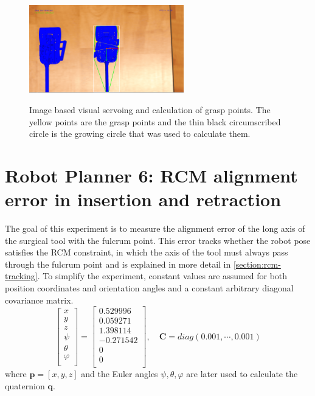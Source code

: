 \begin{center}
\begin{figure}[!htb]
\centering
\includegraphics[width=0.6\textwidth]{images/grasp-points-triangle.png}\\
\caption{Image based visual servoing and calculation of grasp points. The yellow points are the grasp points and the thin black circumscribed circle is the growing circle that was used to calculate them.}
\end{figure}
\end{center}



\section{Robot Planner 6: RCM alignment error in insertion and retraction}

The goal of this experiment is to measure the alignment error of the long axis of the surgical tool with the fulcrum point. This error tracks whether the robot pose satisfies the RCM constraint, 
in which the axis of the tool must always pass through the fulcrum point and is explained in more detail in \ref{section:rcm-tracking}. To simplify the experiment, 
constant values are assumed for both position coordinates and orientation angles and a constant arbitrary diagonal covariance matrix.
\begin{equation}
\begin{bmatrix}
x \\ y \\ z \\ ψ \\ θ \\ φ \\
\end{bmatrix} = 
\begin{bmatrix}
0.529996 \\ 0.059271 \\ 1.398114 \\ -0.271542 \\ 0 \\ 0 \\
\end{bmatrix}, \quad \mathbf{C} = diag(0.001, \cdots, 0.001)
\end{equation}
where $\mathbf{p} = [x,y,z]$ and the Euler angles $ψ, θ, φ$ are later used to calculate the quaternion $\mathbf{q}$. \\


